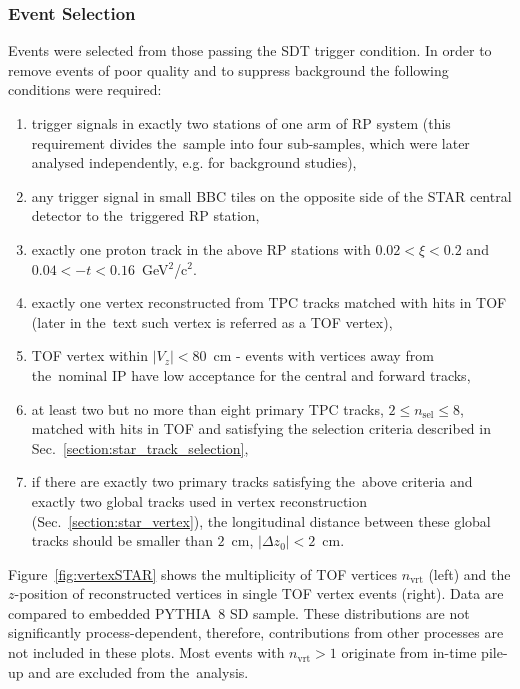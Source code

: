 \subsubsection{Event Selection}\label{section:star_event_selection}
Events were selected from those passing the SDT trigger condition. In order to remove events of poor quality and to suppress background the following conditions were required:
\begin{enumerate}
	\item trigger signals in exactly two stations of one arm of \ac{RP} system (this requirement divides the~sample into four  sub-samples, which were later analysed independently, e.g. for background studies),
	\item any trigger signal in small BBC tiles on the opposite side of the STAR central detector to the~triggered RP station,
	\item exactly one proton track in the above RP stations with $0.02 < \xi < 0.2$ and $0.04 < -t < 0.16$~GeV$^{2}$/c$^{2}$. 
	\item exactly one  vertex  reconstructed from  TPC tracks matched with hits in TOF (later in the~text such vertex  is referred as a TOF vertex),
	\item TOF vertex  within $|V_z|<80$~cm - events with vertices away from the~nominal IP have low acceptance for the central and forward tracks,%
	\item at least two but no more than eight primary TPC tracks, $2\leq n_{\textrm{sel}}\leq 8$, matched with hits in TOF and satisfying the selection criteria described in Sec.~\ref{section:star_track_selection},
	\item if there are exactly two primary tracks satisfying the~above criteria and exactly two global tracks used in vertex reconstruction (Sec.~\ref{section:star_vertex}), the longitudinal distance between these global tracks should be smaller than $2$~cm, $|\Delta z_0|<2$~cm. %
\end{enumerate}
Figure~\ref{fig:vertexSTAR} shows the multiplicity of TOF vertices $n_\textrm{vrt}$ (left)  and the $z$-position of  reconstructed vertices in single TOF vertex events (right). Data are compared to embedded PYTHIA~8 SD sample. These distributions are not significantly process-dependent, therefore, contributions from other processes are not included in these plots. Most events with $n_\textrm{vrt} > 1$ originate from in-time pile-up and are excluded from the~analysis.
